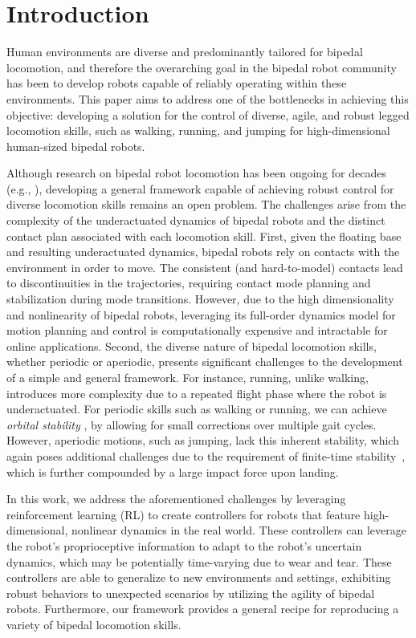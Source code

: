 \section{Introduction}\label{sec:intro}
Human environments are diverse and predominantly tailored for bipedal locomotion, and therefore the overarching goal in the bipedal robot community has been to develop robots capable of reliably operating within these environments.
This paper aims to address one of the bottlenecks in achieving this objective: developing a solution for the control of diverse, agile, and robust legged locomotion skills, such as walking, running, and jumping for high-dimensional human-sized bipedal robots. 

Although research on bipedal robot locomotion has been ongoing for decades (e.g., \cite{Raibert-1984-15614}), developing a general framework capable of achieving robust control for diverse locomotion skills remains an open problem. 
The challenges arise from the complexity of the underactuated dynamics of bipedal robots and the distinct contact plan associated with each locomotion skill.  
First, given the floating base and resulting underactuated dynamics, bipedal robots rely on contacts with the environment in order to move. 
The consistent (and hard-to-model) contacts lead to discontinuities in the trajectories, requiring contact mode planning and stabilization during mode transitions.
However, due to the high dimensionality and nonlinearity of bipedal robots, leveraging its full-order dynamics model for motion planning and control is computationally expensive and intractable for online applications.
Second, the diverse nature of bipedal locomotion skills, whether periodic or aperiodic, presents significant challenges to the development of a simple and general framework.
For instance, running, unlike walking, introduces more complexity due to a repeated flight phase where the robot is underactuated. %
For periodic skills such as walking or running, we can achieve \textit{orbital stability} \citep{westervelt2003hybrid}, by allowing for small corrections over multiple gait cycles. 
However, aperiodic motions, such as jumping, lack this inherent stability, which again poses additional challenges due to the requirement of finite-time stability~\citep{goswami2009planar}, which is further compounded by a large impact force upon landing. 

In this work, we address the aforementioned challenges by leveraging reinforcement learning (RL) to create controllers for robots that feature high-dimensional, nonlinear dynamics in the real world. 
These controllers can leverage the robot's proprioceptive information to adapt to the robot's uncertain dynamics, which may be potentially time-varying due to wear and tear.
These controllers are able to generalize to new environments and settings, exhibiting robust behaviors to unexpected scenarios by utilizing the agility of bipedal robots.
Furthermore, our framework provides a general recipe for reproducing a variety of bipedal locomotion skills.





